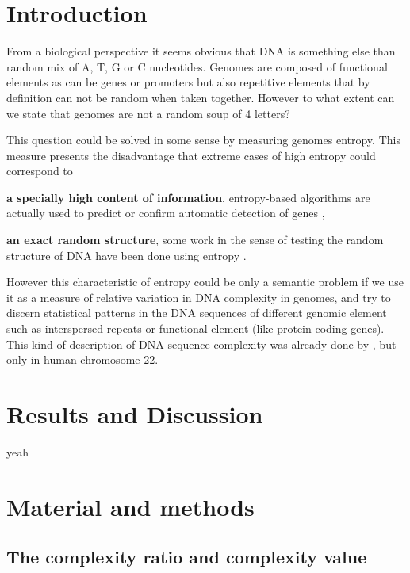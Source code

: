 

\section{Introduction}
\label{sec:dna_struct-intro}

From a biological perspective it seems obvious that DNA is something else than random mix of A, T, G or C nucleotides. Genomes are composed of functional elements as can be genes or promoters but also repetitive elements that by definition can not be random when taken together. However to what extent can we state that genomes are not a random soup of 4 letters? 

This question could be solved in some sense by measuring genomes entropy. This measure presents the disadvantage that extreme cases of high entropy could correspond to \begin{inparaenum} \item {\bf a specially high content of information}, entropy-based algorithms are actually used to predict or confirm automatic detection of genes \cite{Du2006,Gerstein2007}, \item {\bf an exact random structure}, some work in the sense of testing the random structure of DNA have been done using entropy \cite{Loewenstern1999}. \end{inparaenum} However this characteristic of entropy could be only a semantic problem if we use it as a measure of relative variation in DNA complexity in genomes, and try to discern statistical patterns in the DNA sequences of different genomic element such as interspersed repeats or functional element (like protein-coding genes). This kind of description of DNA sequence complexity was already done by \cite{Holste2001}, but only in human chromosome 22.

\section{Results and Discussion}
\label{sec:dna_struct-result}

yeah

\section{Material and methods}
\label{sec:dna_struct-matmet}

\subsection{The complexity ratio and complexity value}
\label{sec:compl-ratio-compl}

